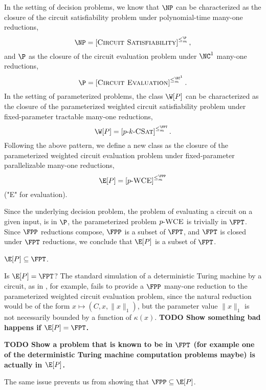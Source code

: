 \documentclass{article}
\newcommand{\todo}[1]{\textbf{TODO #1}}
\newcommand{\dash}{\textnormal{-}}
\newcommand{\pCkSAT}{p \dash k \dash \textsc{CSat}}
\newcommand{\pWCE}{p \dash \textsc{WCE}}
\newcommand{\cl}[1]{\left[{#1}\right]}
\begin{document}
In the setting of decision problems, we know that $\NP$ can be characterized as the closure of the circuit satisfiability problem under polynomial-time many-one reductions,
\[
\NP = \cl{\textsc{Circuit Satisfiability}}^{\leq_m^\P},
\]
and $\P$ as the closure of the circuit evaluation problem under $\NC^1$ many-one reductions,
\[
\P = \cl{\textsc{Circuit Evaluation}}^{\leq_m^{\NC^1}}.
\]
In the setting of parameterized problems, the class $\W[P]$ can be characterized as the closure of the parameterized weighted circuit satisfiability problem under fixed-parameter tractable many-one reductions,
\[
\W[P] = \cl{\pCkSAT}^{\leq_m^{\FPT}}.
\]
Following the above pattern, we define a new class as the closure of the parameterized weighted circuit evaluation problem under fixed-parameter parallelizable many-one reductions,
\[
\E[P] = \cl{\pWCE}^{\leq_m^{\FPP}}
\]
("E" for evaluation).

Since the underlying decision problem, the problem of evaluating a circuit on a given input, is in $\P$, the parameterized problem $\pWCE$ is trivially in $\FPT$.
Since $\FPP$ reductions compose, $\FPP$ is a subset of $\FPT$, and $\FPT$ is closed under $\FPT$ reductions, we conclude that $\E[P]$ is a subset of $\FPT$.

\begin{theorem}
  $\E[P] \subseteq \FPT$.
\end{theorem}

Is $\E[P] = \FPT$?
The standard simulation of a deterministic Turing machine by a circuit, as in \autocite{ladner75}, for example, fails to provide a $\FPP$ many-one reduction to the parameterized weighted circuit evaluation problem, since the natural reduction would be of the form $x \mapsto (C, x, \|x\|_1)$, but the parameter value $\|x\|_1$ is not necessarily bounded by a function of $\kappa(x)$.
\todo{Show something bad happens if $\E[P] = \FPT$.}

\todo{Show a problem that is known to be in $\FPT$ (for example one of the deterministic Turing machine computation problems maybe) is actually in $\E[P]$.}

The same issue prevents us from showing that $\FPP \subseteq \E[P]$.

\printbibliography
\end{document}
